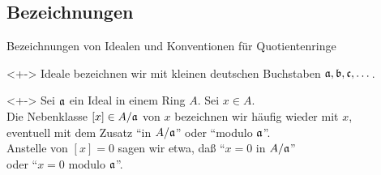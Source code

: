 \subsection{Bezeichnungen}

\begin{frame}{Bezeichnungen von Idealen und Konventionen für Quotientenringe}
    \begin{convention}<+->
        Ideale bezeichnen wir mit kleinen deutschen Buchstaben \(\mathfrak{a}, \mathfrak{b},
        \mathfrak{c}, \dots\).
    \end{convention}
    \begin{visibleenv}<+->
        Sei \(\mathfrak{a}\) ein Ideal in einem Ring \(A\). Sei \(x \in A\).\\
        Die Nebenklasse \([x] \in A/\mathfrak{a}\) von \(x\) bezeichnen wir häufig
        wieder mit \(x\),\\
        eventuell mit dem Zusatz "`in \(A/\mathfrak{a}\)"' oder
        "`modulo \(\mathfrak{a}\)"'.\\
        Anstelle von \([x] = 0\) sagen wir etwa, daß "`\(x = 0\) in
        \(A/\mathfrak{a}\)"'\\
        oder "`\(x = 0\) modulo \(\mathfrak{a}\)"'.
    \end{visibleenv}
\end{frame}

